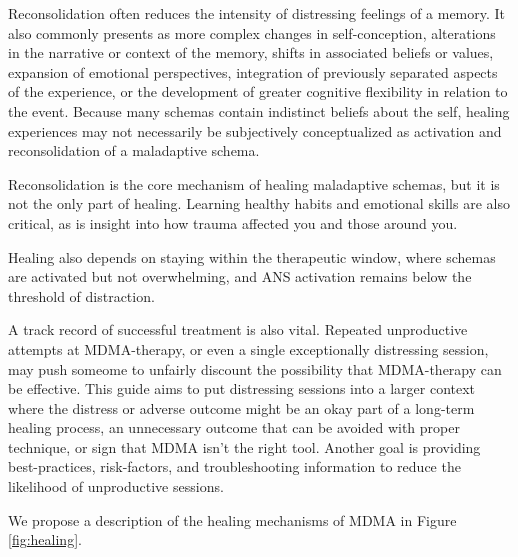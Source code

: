 \documentclass[12pt,letterpaper]{article}
\begin{document}
Reconsolidation often reduces the intensity of distressing feelings of a memory. It also commonly presents as more complex changes in self-conception, alterations in the narrative or context of the memory, shifts in associated beliefs or values, expansion of emotional perspectives, integration of previously separated aspects of the experience, or the development of greater cognitive flexibility in relation to the event. Because many schemas contain indistinct beliefs about the self, healing experiences may not necessarily be subjectively conceptualized as activation and reconsolidation of a maladaptive schema.

\vspace{\baselineskip}

Reconsolidation is the core mechanism of healing maladaptive schemas, but it is not the only part of healing. Learning healthy habits and emotional skills are also critical, as is insight into how trauma affected you and those around you.

Healing also depends on staying within the therapeutic window, where schemas are activated but not overwhelming, and ANS activation remains below the threshold of distraction.

A track record of successful treatment is also vital. Repeated unproductive attempts at MDMA-therapy, or even a single exceptionally distressing session, may push someome to unfairly discount the possibility that MDMA-therapy can be effective. This guide aims to put distressing sessions into a larger context where the distress or adverse outcome might be an okay part of a long-term healing process, an unnecessary outcome that can be avoided with proper technique, or sign that MDMA isn't the right tool. Another goal is providing best-practices, risk-factors, and troubleshooting information to reduce the likelihood of unproductive sessions.

We propose a description of the healing mechanisms of MDMA in Figure \ref{fig:healing}.
\end{document}
